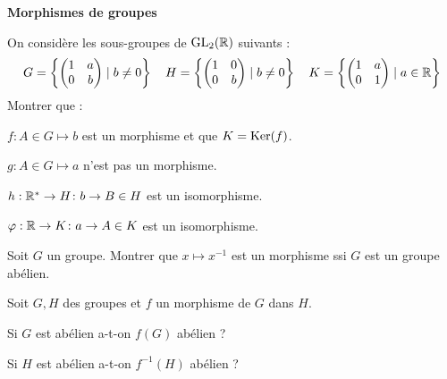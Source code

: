 \documentclass{report}
\begin{document}
\begin{center}
    \huge{\textbf{Morphismes de groupes}}
\end{center}

\begin{exo}
    On considère les sous-groupes de \(\text{GL}_2(\mathbb{R})\) suivants :
    \[ G=\left\{ \begin{pmatrix}1&a\\0&b\end{pmatrix}
        \mid b\neq 0 \right\} \quad
       H=\left\{ \begin{pmatrix}1&0\\0&b\end{pmatrix}
       \mid b \neq 0 \right\} \quad
       K=\left\{ \begin{pmatrix}1&a\\0&1\end{pmatrix}
       \mid a \in \mathbb{R} \right\}
    \] Montrer que :
    \begin{q}{1}
        \(f : A\in G \mapsto b\) est un morphisme et que \(K=\operatorname{Ker}(f)\).
    \end{q}
    \begin{q}{2}
        \(g : A\in G \mapsto a\) n'est pas un morphisme.
    \end{q}
    \begin{q}{3}
        \(h: \mathbb{R}^*\to H\colon b \to B\in H\) est un isomorphisme.
    \end{q}
    \begin{q}{4}
        \(\varphi: \mathbb{R}\to K\colon a \to A\in K\) est un isomorphisme.
    \end{q}
\end{exo}

\begin{exo}
    Soit \(G\) un groupe. Montrer que \(x\mapsto x^{-1}\) est un morphisme
    ssi \(G\) est un groupe abélien.
\end{exo}

\begin{exo}
    Soit \(G, H\) des groupes et \(f\) un morphisme de \(G\) dans \(H\).
    \begin{q}{1}
        Si \(G\) est abélien a-t-on \(f(G)\) abélien ?
    \end{q}
    \begin{q}{2}
        Si \(H\) est abélien a-t-on \(f^{-1}(H)\) abélien ?
    \end{q}
\end{exo}
\end{document}
